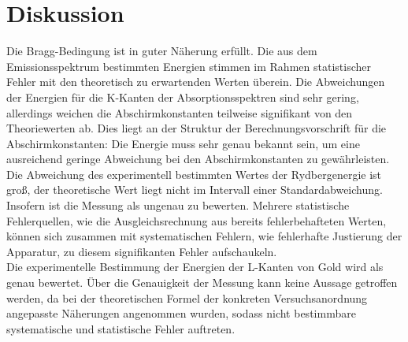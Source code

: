 \section{Diskussion}
\label{sec:Diskussion}

Die Bragg-Bedingung ist in guter Näherung erfüllt. Die aus dem Emissionsspektrum
bestimmten Energien stimmen im Rahmen statistischer Fehler mit den theoretisch zu erwartenden Werten überein.
Die Abweichungen der Energien für die K-Kanten der Absorptionsspektren sind sehr gering, allerdings
weichen die Abschirmkonstanten teilweise signifikant von den Theoriewerten ab. Dies liegt an
der Struktur der Berechnungsvorschrift für die Abschirmkonstanten: Die Energie muss sehr genau bekannt sein,
um eine ausreichend geringe Abweichung bei den Abschirmkonstanten zu gewährleisten.\\
Die Abweichung des experimentell bestimmten Wertes der Rydbergenergie ist groß, der theoretische Wert
liegt nicht im Intervall einer Standardabweichung. Insofern ist die Messung als ungenau zu bewerten.
Mehrere statistische Fehlerquellen, wie die Ausgleichsrechnung aus bereits fehlerbehafteten Werten, können
sich zusammen mit systematischen Fehlern, wie fehlerhafte Justierung der Apparatur, zu diesem
signifikanten Fehler aufschaukeln.\\
Die experimentelle Bestimmung der Energien der L-Kanten von Gold wird als genau bewertet.
Über die Genauigkeit der Messung kann keine Aussage getroffen werden, da bei der theoretischen Formel
der konkreten Versuchsanordnung angepasste Näherungen angenommen wurden, sodass nicht bestimmbare
systematische und statistische Fehler auftreten.\\
